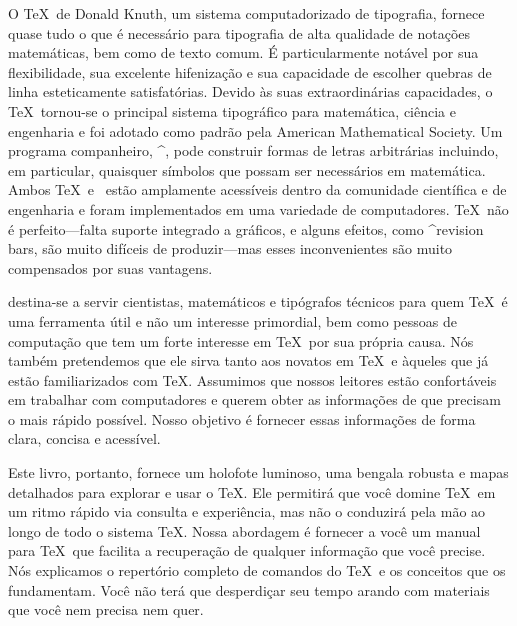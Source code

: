 


{\tighten
O \TeX\ de Donald Knuth, um sistema computadorizado de tipografia, 
fornece quase tudo o que \'e necess\'ario para tipografia de alta 
qualidade de nota\c c\~oes matem\'aticas, bem como de texto comum.  \'E 
particularmente not\'avel por sua flexibilidade, sua excelente 
hifeniza\c c\~ao e sua capacidade de escolher quebras de linha 
esteticamente satisfat\'orias.  Devido \`as suas extraordin\'arias 
capacidades, o \TeX\ tornou-se o principal sistema tipogr\'afico para 
matem\'atica, ci\^encia e engenharia e foi adotado como padr\~ao pela 
American Mathematical Society.  Um programa companheiro, ^{\Metafont}, 
pode construir formas de letras arbitr\'arias incluindo, em particular, 
quaisquer s\'imbolos que possam ser necess\'arios em matem\'atica.  
Ambos \TeX\ e \Metafont\ est\~ao amplamente acess\'iveis dentro da 
comunidade cient\'ifica e de engenharia e foram implementados em uma 
variedade de computadores.  \TeX\ n\~ao \'e perfeito---falta suporte 
integrado a gr\'aficos, e alguns efeitos, como ^{revision bars}, s\~ao 
muito dif\'iceis de produzir---mas esses inconvenientes s\~ao muito 
compensados por suas vantagens.
\par}

\thisbook\/ destina-se a servir cientistas, matem\'aticos e tip\'ografos 
t\'ecnicos para quem \TeX\ \'e uma ferramenta \'util e n\~ao um 
interesse primordial, bem como pessoas de computa\c c\~ao que tem um 
forte interesse em \TeX\ por sua pr\'opria causa.  N\'os tamb\'em 
pretendemos que ele sirva tanto aos novatos em \TeX\ e \`aqueles que 
j\'a est\~ao familiarizados com \TeX.  Assumimos que nossos leitores 
est\~ao confort\'aveis em trabalhar com computadores e querem obter as 
informa\c c\~oes de que precisam o mais r\'apido poss\'ivel.  Nosso 
objetivo \'e fornecer essas informa\c c\~oes de forma clara, concisa e 
acess\'ivel.
{\tighten Este livro, portanto, fornece um holofote luminoso, uma 
bengala robusta e mapas detalhados para explorar e usar o \TeX.  Ele 
permitir\'a que voc\^e domine \TeX\ em um ritmo r\'apido via consulta e 
experi\^encia, mas n\~ao o conduzir\'a pela m\~ao ao longo de todo o 
sistema \TeX.  Nossa abordagem \'e fornecer a voc\^e um manual para 
\TeX\ que facilita a recupera\c c\~ao de qualquer informa\c c\~ao que 
voc\^e precise.  N\'os explicamos o repert\'orio completo de comandos do 
\TeX\ e os conceitos que os fundamentam.  Voc\^e n\~ao ter\'a que 
desperdi\c car seu tempo arando com materiais que voc\^e nem precisa nem 
quer.  \par}

